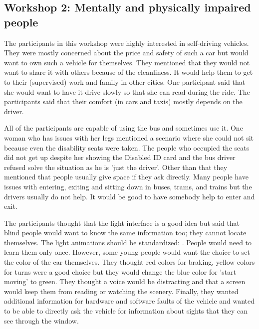 \subsection{Workshop 2: Mentally and physically impaired people}
The participants in this workshop were highly interested in self-driving vehicles. They were mostly concerned about the price and safety of such a car but would want to own such a vehicle for themselves. They mentioned that they would not want to share it with others because of the cleanliness. It would help them to get to their (supervised) work and family in other cities. One participant said that she would want to have it drive slowly so that she can read during the ride. The participants said that their comfort (in cars and taxis) mostly depends on the driver. 

All of the participants are capable of using the bus and sometimes use it. One woman who has issues with her legs mentioned a scenario where she could not sit because even the disability seats were taken. The people who occupied the seats did not get up despite her showing the Disabled ID card and the bus driver refused solve the situation as he is 'just the driver'. Other than that they mentioned that people usually give space if they ask directly. Many people have issues with entering, exiting and sitting down in buses, trams, and trains but the drivers usually do not help. It would be good to have somebody help to enter and exit. 

The participants thought that the light interface is a good idea but said that blind people would want to know the same information too; they cannot locate themselves. The light animations should be standardized: . People would need to learn them only once. However, some young people would want the choice to set the color of the car themselves. They thought red colors for braking, yellow colors for turns were a good choice but they would change the blue color for 'start moving' to green.  They thought a voice would be distracting and that a screen would keep them from reading or watching the scenery. Finally, they wanted additional information for hardware and software faults of the vehicle and wanted to be able to directly ask the vehicle for information about sights that they can see through the window.
